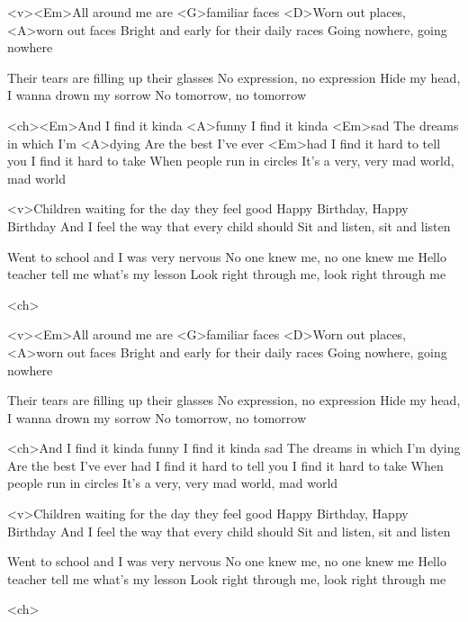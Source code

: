 


	\begin{song}
		<v><Em>All around me are <G>familiar faces
		<D>Worn out places, <A>worn out faces
		Bright and early for their daily races
		Going nowhere, going nowhere
			
		Their tears are filling up their glasses
		No expression, no expression
		Hide my head, I wanna drown my sorrow
		No tomorrow, no tomorrow

		<ch><Em>And I find it kinda <A>funny
		I find it kinda <Em>sad
		The dreams in which I'm <A>dying
		Are the best I've ever <Em>had
		I find it hard to tell you
		I find it hard to take
		When people run in circles
		It's a very, very mad world, mad world

		<v>Children waiting for the day they feel good
		Happy Birthday, Happy Birthday
		And I feel the way that every child should
		Sit and listen, sit and listen

		Went to school and I was very nervous
		No one knew me, no one knew me
		Hello teacher tell me what's my lesson
		Look right through me, look right through me

		<ch>
	\end{song}
	\begin{song}
		<v><Em>All around me are <G>familiar faces
		<D>Worn out places, <A>worn out faces
		Bright and early for their daily races
		Going nowhere, going nowhere
			
		Their tears are filling up their glasses
		No expression, no expression
		Hide my head, I wanna drown my sorrow
		No tomorrow, no tomorrow

		<ch>And I find it kinda funny
		I find it kinda sad
		The dreams in which I'm dying
		Are the best I've ever had
		I find it hard to tell you
		I find it hard to take
		When people run in circles
		It's a very, very mad world, mad world

		<v>Children waiting for the day they feel good
		Happy Birthday, Happy Birthday
		And I feel the way that every child should
		Sit and listen, sit and listen

		Went to school and I was very nervous
		No one knew me, no one knew me
		Hello teacher tell me what's my lesson
		Look right through me, look right through me

		<ch>
	\end{song}


